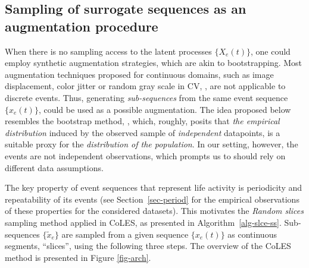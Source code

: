 \documentclass[sigconf, anonymous]{acmart}
\begin{document}
\subsection{Sampling of surrogate sequences as an augmentation procedure} \label{sec-pos-pairs}

When there is no sampling access to the latent processes $\{X_e(t)\}$, one could employ synthetic
augmentation strategies, which are akin to bootstrapping. Most augmentation techniques proposed
for continuous domains, such as image displacement, color jitter or random gray scale in CV, \citep{Falcon2020AFF},
are not applicable to discrete events. Thus, generating \emph{sub-sequences} from the same event
sequence $\{x_e(t)\}$, could be used as a possible augmentation.
%
The idea proposed below resembles the bootstrap method, \citep{Efron1994Bootstrap}, which, roughly,
posits that \emph{the empirical distribution} induced by the observed sample of \emph{independent}
datapoints, is a suitable proxy for the \emph{distribution of the population}.
% 
In our setting, however, the events are not independent observations, which prompts us to should
rely on different data assumptions.

The key property of event sequences that represent life activity is periodicity and repeatability
of its events (see Section~\ref{sec-period} for the empirical observations of these properties
for the considered datasets). This motivates the \emph{Random slices} sampling method applied
in CoLES, as presented in Algorithm~\ref{alg-slce-ss}. Sub-sequences $\{\tilde{x}_e\}$ are sampled
from a given sequence $\{x_e(t)\}$ as continuous segments, ``slices'', using the following three
steps.
The overview of the CoLES method is presented in Figure \ref{fig-arch}.
\end{document}
